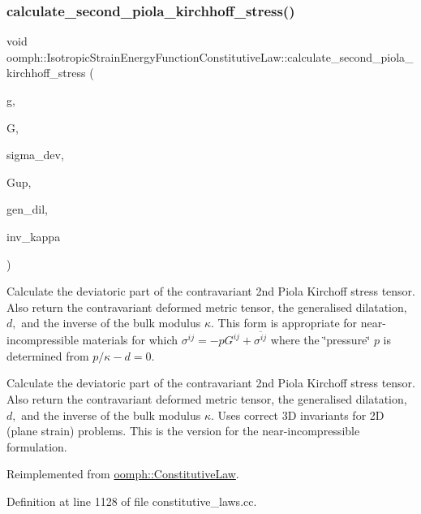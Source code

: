 \subsubsection{\texorpdfstring{calculate\+\_\+second\+\_\+piola\+\_\+kirchhoff\+\_\+stress()}{calculate\_second\_piola\_kirchhoff\_stress()}\hspace{0.1cm}{\footnotesize\ttfamily [3/3]}}
{\footnotesize\ttfamily void oomph\+::\+Isotropic\+Strain\+Energy\+Function\+Constitutive\+Law\+::calculate\+\_\+second\+\_\+piola\+\_\+kirchhoff\+\_\+stress (\begin{DoxyParamCaption}\item[{const \hyperlink{classoomph_1_1DenseMatrix}{Dense\+Matrix}$<$ double $>$ \&}]{g,  }\item[{const \hyperlink{classoomph_1_1DenseMatrix}{Dense\+Matrix}$<$ double $>$ \&}]{G,  }\item[{\hyperlink{classoomph_1_1DenseMatrix}{Dense\+Matrix}$<$ double $>$ \&}]{sigma\+\_\+dev,  }\item[{\hyperlink{classoomph_1_1DenseMatrix}{Dense\+Matrix}$<$ double $>$ \&}]{Gup,  }\item[{double \&}]{gen\+\_\+dil,  }\item[{double \&}]{inv\+\_\+kappa }\end{DoxyParamCaption})\hspace{0.3cm}{\ttfamily [virtual]}}



Calculate the deviatoric part of the contravariant 2nd Piola Kirchoff stress tensor. Also return the contravariant deformed metric tensor, the generalised dilatation, $ d, $ and the inverse of the bulk modulus $ \kappa$. This form is appropriate for near-\/incompressible materials for which $ \sigma^{ij} = -p G^{ij} + \overline{ \sigma^{ij}} $ where the \char`\"{}pressure\char`\"{} $ p $ is determined from $ p / \kappa - d =0 $. 

Calculate the deviatoric part of the contravariant 2nd Piola Kirchoff stress tensor. Also return the contravariant deformed metric tensor, the generalised dilatation, $ d, $ and the inverse of the bulk modulus $ \kappa$. Uses correct 3D invariants for 2D (plane strain) problems. This is the version for the near-\/incompressible formulation. 

Reimplemented from \hyperlink{classoomph_1_1ConstitutiveLaw_a26f34355b626bebcad8f498fa5271d20}{oomph\+::\+Constitutive\+Law}.



Definition at line 1128 of file constitutive\+\_\+laws.\+cc.



